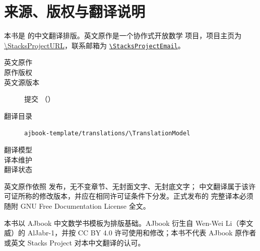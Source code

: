 \chapter*{来源、版权与翻译说明}

\noindent
本书是 \StacksProjectName{} 的中文翻译排版。英文原作是一个协作式开放数学
项目，项目主页为 \url{\StacksProjectURL}，联系邮箱为
\href{mailto:\StacksProjectEmail}{\nolinkurl{\StacksProjectEmail}}。

\begin{description}
  \item[英文原作] \StacksOriginalAuthor
  \item[原作版权] \StacksOriginalCopyright
  \item[英文源版本] 提交 \texttt{\StacksSourceRevision}（\StacksSourceDate）
  \item[翻译目录] \nolinkurl{ajbook-template/translations/\TranslationModel}
  \item[翻译模型] \TranslationModelName
  \item[译本维护] \TranslationMaintainer
  \item[翻译状态] \TranslationStatus
\end{description}

\noindent
英文原作依照 \StacksLicenseName{} 发布，无不变章节、无封面文字、无封底文字；
中文翻译属于该许可证所称的修改版本，并应在相同许可证条件下分发。正式发布的
完整译本必须随附 GNU Free Documentation License 全文。

\medskip\noindent
\TranslationNotice

\medskip\noindent
本书以 AJbook 中文数学书模板为排版基础。AJbook 衍生自 Wen-Wei Li（李文威）的
AlJabr-1，并按 CC BY 4.0 许可使用和修改；本书不代表 AJbook 原作者或英文
Stacks Project 对本中文翻译的认可。

